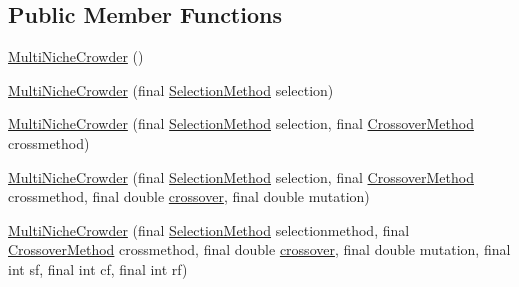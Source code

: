 \subsection*{Public Member Functions}
\begin{CompactItemize}
\item 
\hyperlink{classjenes_1_1stage_1_1operator_1_1common_1_1_multi_niche_crowder_3_01_t_01extends_01_chromosome_01_4_0e3210ea1f2d3f1687f5c1f9a0f326dd}{MultiNicheCrowder} ()
\item 
\hyperlink{classjenes_1_1stage_1_1operator_1_1common_1_1_multi_niche_crowder_3_01_t_01extends_01_chromosome_01_4_45d8181936a9298ecc7edcfee8647590}{MultiNicheCrowder} (final \hyperlink{classjenes_1_1stage_1_1operator_1_1common_1_1_multi_niche_crowder_3_01_t_01extends_01_chromosome_01_4_1190dbbe875b99f6679f7b5deb68483b}{SelectionMethod} selection)
\item 
\hyperlink{classjenes_1_1stage_1_1operator_1_1common_1_1_multi_niche_crowder_3_01_t_01extends_01_chromosome_01_4_5f539242ac756ac79df20945afc5e425}{MultiNicheCrowder} (final \hyperlink{classjenes_1_1stage_1_1operator_1_1common_1_1_multi_niche_crowder_3_01_t_01extends_01_chromosome_01_4_1190dbbe875b99f6679f7b5deb68483b}{SelectionMethod} selection, final \hyperlink{classjenes_1_1stage_1_1operator_1_1common_1_1_multi_niche_crowder_3_01_t_01extends_01_chromosome_01_4_273881bd444aeae8ef77816000eac94c}{CrossoverMethod} crossmethod)
\item 
\hyperlink{classjenes_1_1stage_1_1operator_1_1common_1_1_multi_niche_crowder_3_01_t_01extends_01_chromosome_01_4_d6b691057f10397e80669b101c7f437a}{MultiNicheCrowder} (final \hyperlink{classjenes_1_1stage_1_1operator_1_1common_1_1_multi_niche_crowder_3_01_t_01extends_01_chromosome_01_4_1190dbbe875b99f6679f7b5deb68483b}{SelectionMethod} selection, final \hyperlink{classjenes_1_1stage_1_1operator_1_1common_1_1_multi_niche_crowder_3_01_t_01extends_01_chromosome_01_4_273881bd444aeae8ef77816000eac94c}{CrossoverMethod} crossmethod, final double \hyperlink{classjenes_1_1stage_1_1operator_1_1common_1_1_multi_niche_crowder_3_01_t_01extends_01_chromosome_01_4_d584be099b23576ec3379a6867d31ef4}{crossover}, final double mutation)
\item 
\hyperlink{classjenes_1_1stage_1_1operator_1_1common_1_1_multi_niche_crowder_3_01_t_01extends_01_chromosome_01_4_7384c823b16fe8e5f8bfdc7db0c87ce5}{MultiNicheCrowder} (final \hyperlink{classjenes_1_1stage_1_1operator_1_1common_1_1_multi_niche_crowder_3_01_t_01extends_01_chromosome_01_4_1190dbbe875b99f6679f7b5deb68483b}{SelectionMethod} selectionmethod, final \hyperlink{classjenes_1_1stage_1_1operator_1_1common_1_1_multi_niche_crowder_3_01_t_01extends_01_chromosome_01_4_273881bd444aeae8ef77816000eac94c}{CrossoverMethod} crossmethod, final double \hyperlink{classjenes_1_1stage_1_1operator_1_1common_1_1_multi_niche_crowder_3_01_t_01extends_01_chromosome_01_4_d584be099b23576ec3379a6867d31ef4}{crossover}, final double mutation, final int sf, final int cf, final int rf)

\end{CompactItemize}
